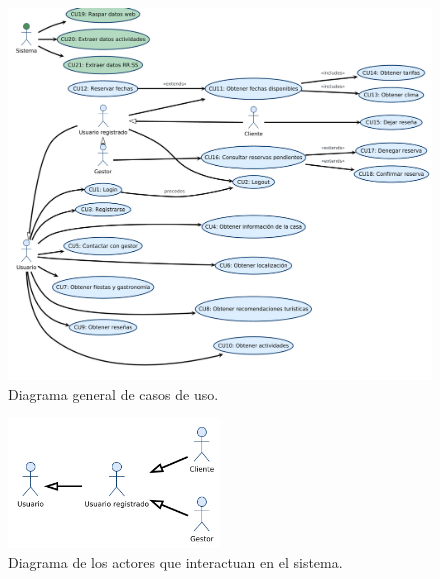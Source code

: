 \begin{figure}[h!tb]
    \centering
    
    \includegraphics[width=1\textwidth]{figs/casos2.png}
    \caption{Diagrama general de casos de uso.\label{fig:casos}}
    
\end{figure}

\begin{figure}[h!tb]
    \centering
    
    \includegraphics[width=0.5\textwidth]{figs/casos_usuario.png}
    \caption{Diagrama de los actores que interactuan en el sistema.\label{fig:casos_usuario}}
    

\end{figure}

